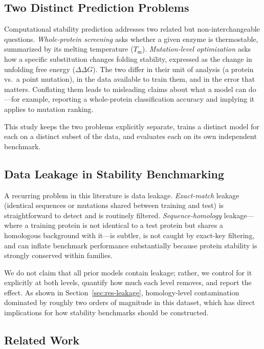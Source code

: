 \documentclass[journal,article,submit,moreauthors]{Definitions/mdpi}
\newcommand{\ddg}{\ensuremath{\Delta\Delta G}}
\newcommand{\Tm}{\ensuremath{T_\mathrm{m}}}
\begin{document}
\subsection{Two Distinct Prediction Problems}

Computational stability prediction addresses two related but non-interchangeable
questions. \emph{Whole-protein screening} asks whether a given enzyme is thermostable,
summarized by its melting temperature (\Tm). \emph{Mutation-level optimization} asks how a
specific substitution changes folding stability, expressed as the change in unfolding free
energy (\ddg). The two differ in their unit of analysis (a protein vs.\ a point mutation),
in the data available to train them, and in the error that matters. Conflating them leads
to misleading claims about what a model can do---for example, reporting a whole-protein
classification accuracy and implying it applies to mutation ranking.

This study keeps the two problems explicitly separate, trains a distinct model for each on
a distinct subset of the data, and evaluates each on its own independent benchmark.

\subsection{Data Leakage in Stability Benchmarking}

A recurring problem in this literature is data leakage. \emph{Exact-match} leakage
(identical sequences or mutations shared between training and test) is straightforward to
detect and is routinely filtered. \emph{Sequence-homology} leakage---where a training
protein is not identical to a test protein but shares a homologous background with
it---is subtler, is not caught by exact-key filtering, and can inflate benchmark
performance substantially because protein stability is strongly conserved within families.

We do not claim that all prior models contain leakage; rather, we control for it explicitly
at both levels, quantify how much each level removes, and report the effect. As shown in
Section~\ref{sec:res-leakage}, homology-level contamination dominated by roughly two orders
of magnitude in this dataset, which has direct implications for how stability benchmarks
should be constructed.

\subsection{Related Work}
\end{document}

